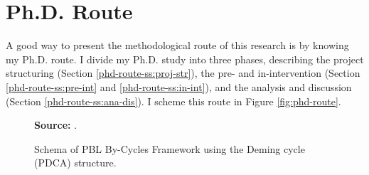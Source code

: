 \section{Ph.D. Route}
\label{res-des-sec:phd-route}

A good way to present the methodological route of this research is by knowing my Ph.D. route. I divide my Ph.D. study into three phases, describing the project structuring (Section \ref{phd-route-ss:proj-str}), the pre- and in-intervention (Section \ref{phd-route-ss:pre-int} and \ref{phd-route-ss:in-int}), and the analysis and discussion (Section \ref{phd-route-ss:ana-dis}). I scheme this route in Figure \ref{fig:phd-route}.

\begin{figure}[ht!]
\centering

\caption{\textmd{Schema of \acrshort{PBL} By-Cycles Framework using the Deming cycle (\acrshort{PDCA}) structure.}}
\label{fig:pbl-by-cycles}

\par\medskip\ABNTEXfontereduzida\selectfont\textbf{Source:} .
\end{figure}

